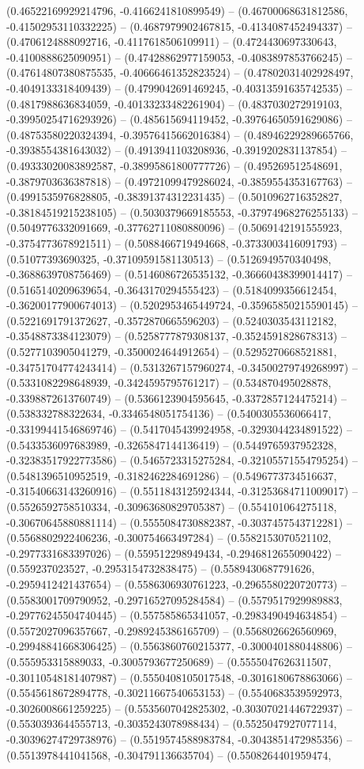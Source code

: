 (0.46522169929214796, -0.4166241810899549) -- (0.46700068631812586, -0.41502953110332225) -- (0.4687979902467815, -0.4134087452494337) -- (0.4706124888092716, -0.4117618506109911) -- (0.4724430697330643, -0.4100888625090951) -- (0.47428862977159053, -0.4083897853766245) -- (0.47614807380875535, -0.40666461352823524) -- (0.47802031402928497, -0.4049133318409439) -- (0.4799042691469245, -0.40313591635742535) -- (0.4817988636834059, -0.40133233482261904) -- (0.4837030272919103, -0.39950254716293926) -- (0.485615694119452, -0.39764650591629086) -- (0.48753580220324394, -0.39576415662016384) -- (0.48946229289665766, -0.3938554381643032) -- (0.4913941103208936, -0.3919202831137854) -- (0.49333020083892587, -0.38995861800777726) -- (0.495269512548691, -0.3879703636387818) -- (0.49721099479286024, -0.3859554353167763) -- (0.4991535976828805, -0.38391374312231435) -- (0.5010962716352827, -0.38184519215238105) -- (0.5030379669185553, -0.37974968276255133) -- (0.5049776332091669, -0.37762711080880096) -- (0.5069142191555923, -0.3754773678921511) -- (0.5088466719494668, -0.3733003416091793) -- (0.51077393690325, -0.37109591581130513) -- (0.5126949570340498, -0.3688639708756469) -- (0.5146086726535132, -0.36660438399014417) -- (0.5165140209639654, -0.3643170294555423) -- (0.5184099356612454, -0.36200177900674013) -- (0.5202953465449724, -0.35965850215590145) -- (0.5221691791372627, -0.3572870665596203) -- (0.5240303543112182, -0.3548873384123079) -- (0.5258777879308137, -0.3524591828678313) -- (0.5277103905041279, -0.3500024644912654) -- (0.5295270668521881, -0.34751704774243414) -- (0.5313267157960274, -0.34500279749268997) -- (0.5331082298648939, -0.3424595795761217) -- (0.534870495028878, -0.3398872613760749) -- (0.5366123904595645, -0.3372857124475214) -- (0.538332788322634, -0.3346548051754136) -- (0.5400305536066417, -0.33199441546869746) -- (0.5417045439924958, -0.3293044234891522) -- (0.5433536097683989, -0.3265847144136419) -- (0.5449765937952328, -0.32383517922773586) -- (0.5465723315275284, -0.32105571554795254) -- (0.5481396510952519, -0.3182462284691286) -- (0.5496773734516637, -0.31540663143260916) -- (0.5511843125924344, -0.31253684711009017) -- (0.5526592758510334, -0.30963680829705387) -- (0.554101064275118, -0.30670645880881114) -- (0.5555084730882387, -0.3037457543712281) -- (0.5568802922406236, -0.300754663497284) -- (0.5582153070521102, -0.2977331683397026) -- (0.559512298949434, -0.2946812655090422) -- (0.559237023527, -0.2953154732838475) -- (0.5589430687791626, -0.2959412421437654) -- (0.5586306930761223, -0.2965580220720773) -- (0.5583001709790952, -0.29716527095284584) -- (0.5579517929989883, -0.29776245504740445) -- (0.557585865341057, -0.2983490494634854) -- (0.5572027096357667, -0.2989245386165709) -- (0.5568026626560969, -0.29948841668306425) -- (0.5563860760215377, -0.3000401880448806) -- (0.555953315889033, -0.3005793677250689) -- (0.5555047626311507, -0.30110548181407987) -- (0.5550408105017548, -0.3016180678863066) -- (0.5545618672894778, -0.30211667540653153) -- (0.5540683539592973, -0.3026008661259225) -- (0.5535607042825302, -0.30307021446722937) -- (0.5530393644555713, -0.3035243078988434) -- (0.5525047927077114, -0.30396274729738976) -- (0.5519574588983784, -0.3043851472985356) -- (0.5513978441041568, -0.304791136635704) -- (0.5508264401959474, 